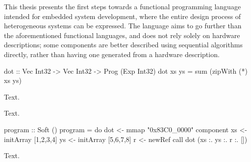 \documentclass[../main.tex]{subfiles}
\begin{document}


This thesis presents the first steps towards a functional programming language intended for embedded system development, where the entire design process of heterogeneous systems can be expressed. The language aims to go further than the aforementioned functional languages, and does not rely solely on hardware descriptions; some components are better described using sequential algorithms directly, rather than having one generated from a hardware description.


\begin{code}
dot :: Vec Int32 -> Vec Int32 -> Prog (Exp Int32)
dot xs ys = sum (zipWith (*) xs ys)
\end{code}

Text.


Text.

\begin{code}
program :: Soft ()
program = do
  dot <- mmap "0x83C0_0000" component
  xs  <- initArray [1,2,3,4]
  ys  <- initArray [5,6,7,8]
  r   <- newRef
  call dot (xs :. ys :. r :. [])
\end{code}

Text.

\end{document}
